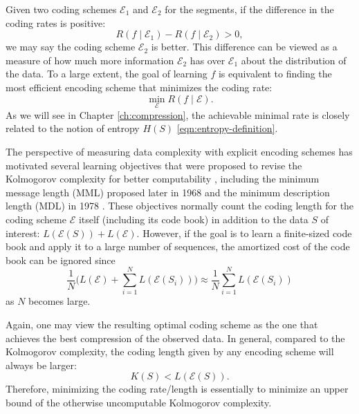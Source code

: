 \documentclass[../../book-main.tex]{subfiles}
\begin{document}
Given two coding schemes $\mathcal{E}_1$ and $\mathcal{E}_2$ for the segments, if the difference in the coding rates is positive:
\begin{equation}
   R(f \mid \mathcal E_1) -  R(f \mid \mathcal E_2) > 0, 
\end{equation}
we may say the coding scheme $\mathcal{E}_2$ is better. This difference can be viewed as a measure of how much more information $\mathcal{E}_2$ has over $\mathcal{E}_1$ about the distribution of the data. To a large extent, the goal of learning $f$ is equivalent to finding the most efficient encoding scheme that minimizes the coding rate:
\begin{equation}
   \min_{\mathcal{E}} R(f \mid \mathcal E). 
\end{equation}
As we will see in Chapter \ref{ch:compression}, the achievable minimal rate is closely related to the notion of entropy $H(S)$ \eqref{eqn:entropy-definition}. 


\begin{remark}\label{rem:computable-complexity}
    {The perspective of measuring data complexity with explicit encoding schemes has motivated several learning objectives that were proposed to revise the Kolmogorov complexity for better computability \cite{WallaceC1999}, including the minimum message length (MML) proposed later in 1968 \cite{WallaceC1968} and the minimum description length (MDL) in 1978 \cite{Rissanen-1978,HansenM2001}. These objectives normally count the coding length for the coding scheme $\mathcal{E}$ itself (including its code book) in addition to the data $S$ of interest: $L(\mathcal E(S)) + L(\mathcal E)$.  However, if the goal is to learn a finite-sized code book and apply it to a large number of sequences, the amortized cost of the code book can be ignored since $$\frac{1}{N}\Big( L(\mathcal{E}) + \sum_{i=1}^N L(\mathcal{E}(S_i))\Big) \approx \frac{1}{N}\sum_{i=1}^N L(\mathcal{E}(S_i))$$ as $N$ becomes large.}
\end{remark}

Again, one may view the resulting optimal coding scheme as the one that achieves the best compression of the observed data. In general, compared to the Kolmogorov complexity, the coding length given by any encoding scheme will always be larger: 
\begin{equation}
    K(S) < L( \mathcal E(S)).
\end{equation} 
Therefore, minimizing the coding rate/length is essentially to minimize an upper bound of the otherwise uncomputable Kolmogorov complexity. 
\end{document}
